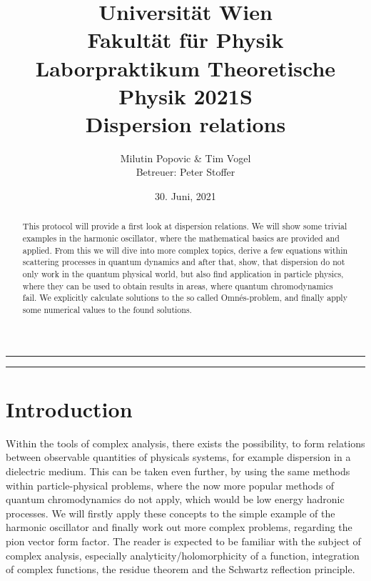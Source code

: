 \documentclass[a4paper]{article}
\title{Universität Wien\\ Fakultät für Physik\\
\vspace{1.25cm}Laborpraktikum Theoretische Physik 2021S \\ Dispersion relations
}
\author{Milutin Popovic \& Tim Vogel \vspace{1cm}\\ Betreuer: Peter Stoffer}
\date{30. Juni, 2021}
\begin{document}
\maketitle
\noindent\rule[0.5ex]{\linewidth}{1pt}
\begin{abstract}
This protocol will provide a first look at dispersion relations. We will show
some trivial examples in the harmonic oscillator, where the mathematical basics
are provided and applied. From this we will dive into more complex topics,
derive a few equations within scattering processes in quantum dynamics and
after that, show, that dispersion do not only work in the quantum physical
world, but also find application in particle physics, where they can be used to
obtain results in areas, where quantum chromodynamics fail. We explicitly
calculate solutions to the so called Omnés-problem, and finally apply some
numerical values to the found solutions.
\end{abstract}
\noindent\rule[0.5ex]{\linewidth}{1pt}
\newcommand{\PV}{\mathop{\mathrlap{\pushR}}\!\int}
\newcommand{\pushR}{\mathchoice
  {\mkern2.5mu P}
  {\scriptstyle P}
  {\scriptscriptstyle P}
  {\scriptscriptstyle P}
}

\tableofcontents
\section{Introduction}
Within the tools of complex analysis, there exists the possibility, to form
relations between observable quantities of physicals systems, for example
dispersion in a dielectric medium. This can be taken even further, by using the
same methods within particle-physical problems, where the now more popular
methods of quantum chromodynamics do not apply, which would be low energy
hadronic processes. We will firstly apply these concepts to the simple example
of the harmonic oscillator and finally work out more complex problems,
regarding the pion vector form factor. The reader is expected to be familiar
with the subject of complex analysis, especially analyticity/holomorphicity of
a function, integration of complex functions, the residue theorem and the
Schwartz reflection principle.
\end{document}
